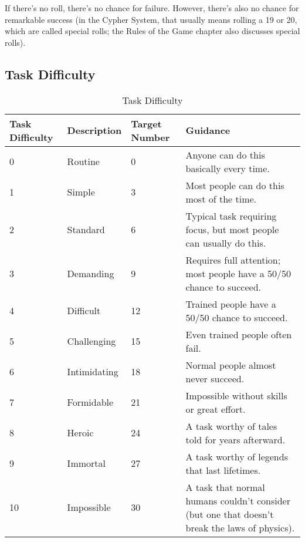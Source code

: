 \begin{multicols}{2}
If there’s no roll, there’s no chance for failure. However, there’s also no chance for remarkable success (in the Cypher System, that usually means rolling a 19 or 20, which are called special rolls; the Rules of the Game chapter also discusses special rolls).

\subsection{Task Difficulty}

\end{multicols}

\begin{table}
\centering

\caption{Task Difficulty}
\label{tab:Task Difficulty}

\begin{tabularx}{\textwidth}{| p{} | p{} | p{} | p{} |}
\hline
\textbf{Task \newline Difficulty} & \textbf{Description} & \textbf{Target Number} & \textbf{Guidance} \\
\hline
0 & Routine & 0 & Anyone can do this basically every time.  \\ \hline
1 & Simple & 3 & Most people can do this most of the time.  \\ \hline
2 & Standard & 6 & Typical task requiring focus, but most people can usually do this.  \\ \hline
3 & Demanding & 9 & Requires full attention; most people have a 50/50 chance to succeed.  \\ \hline
4 & Difficult & 12 & Trained people have a 50/50 chance to succeed.  \\ \hline
5 & Challenging & 15 & Even trained people often fail.  \\ \hline
6 & Intimidating & 18 & Normal people almost never succeed.  \\ \hline
7 & Formidable & 21 & Impossible without skills or great effort.  \\ \hline
8 & Heroic & 24 & A task worthy of tales told for years afterward.  \\ \hline
9 & Immortal & 27 & A task worthy of legends that last lifetimes.  \\ \hline
10 & Impossible & 30 & A task that normal humans couldn’t consider (but one that doesn’t break the laws of physics).  \\ \hline

\end{tabularx}

\end{table}

